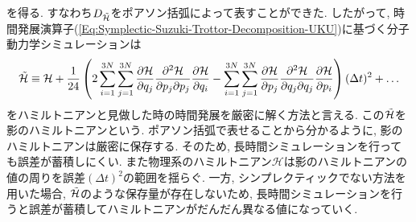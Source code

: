 を得る. すなわち$D_{\Tilde{\mathcal{H}}}$をポアソン括弧によって表すことができた.
したがって, 時間発展演算子(\ref{Eq:Symplectic-Suzuki-Trottor-Decomposition-UKU})に基づく分子動力学シミュレーションは
\begin{align}
  \Tilde{\mathcal{H}}
  \equiv
  \mathcal{H}
  +
  \frac{1}{24}
    \left(
      2
      \sum_{i=1}^{3N} \sum_{j=1}^{3N}
      \frac{\partial \mathcal{H}}{\partial q_{j}}
      \frac{\partial^{2} \mathcal{H}}{\partial p_{j} \partial p_{j}}
      \frac{\partial \mathcal{H}}{\partial q_{i}}
    -
      \sum_{i=1}^{3N} \sum_{j=1}^{3N}
      \frac{\partial \mathcal{H}}{\partial p_{j}}
      \frac{\partial^{2} \mathcal{H}}{\partial q_{j} \partial q_{j}}
      \frac{\partial \mathcal{H}}{\partial p_{i}}
    \right)
    (\Delta t)^{2}
    + \ldots
\end{align}
をハミルトニアンと見做した時の時間発展を厳密に解く方法と言える.
この$\Tilde{\mathcal{H}}$を影のハミルトニアンという.
ポアソン括弧で表せることから分かるように, 影のハミルトニアンは厳密に保存する.
そのため, 長時間シミュレーションを行っても誤差が蓄積しにくい.
また物理系のハミルトニアン$\mathcal{H}$は影のハミルトニアンの値の周りを誤差$(\Delta t)^2$の範囲を揺らぐ.
一方, シンプレクティックでない方法を用いた場合, $\Tilde{\mathcal{H}}$のような保存量が存在しないため, 長時間シミュレーションを行うと誤差が蓄積してハミルトニアンがだんだん異なる値になっていく.







% 
% 

